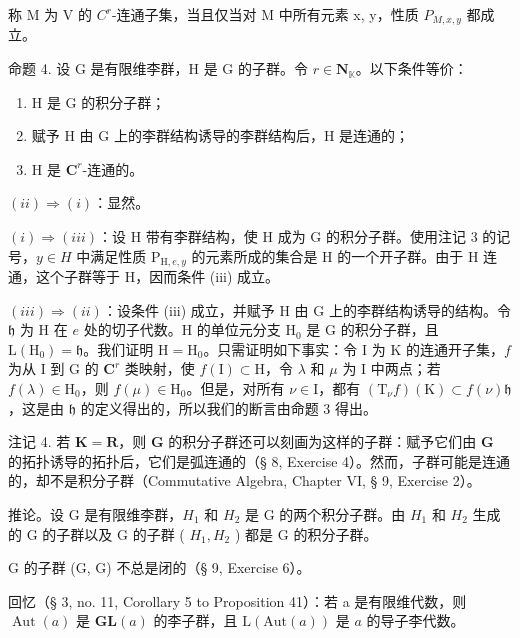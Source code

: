称 M 为 V 的 \(C^{r}\)-连通子集，当且仅当对 M 中所有元素 x, y，性质 \(P_{M,x,y}\) 都成立。

命题 4. 设 G 是有限维李群，H 是 G 的子群。令 \(r \in \mathbf{N}_{\mathbb{K}}\)。以下条件等价：

\begin{enumerate}
\def\labelenumi{(\roman{enumi})}
\item
  H 是 G 的积分子群；
\item
  赋予 H 由 G 上的李群结构诱导的李群结构后，H 是连通的；
\item
  H 是 \(\mathbf{C}^r\)-连通的。
\end{enumerate}

\((ii) \Rightarrow (i)\)：显然。

\((i) \Rightarrow (iii)\)：设 H 带有李群结构，使 H 成为 G 的积分子群。使用注记 3 的记号，\(y \in H\) 中满足性质 \(\mathrm{P}_{\mathrm{H},e,y}\) 的元素所成的集合是 H 的一个开子群。由于 H 连通，这个子群等于 H，因而条件 (iii) 成立。

\((iii) \Rightarrow (ii)\)：设条件 (iii) 成立，并赋予 H 由 G 上的李群结构诱导的结构。令 \(\mathfrak{h}\) 为 H 在 \(e\) 处的切子代数。H 的单位元分支 \(\mathrm{H}_0\) 是 G 的积分子群，且 \(\mathrm{L}(\mathrm{H}_0) = \mathfrak{h}\)。我们证明 \(\mathrm{H} = \mathrm{H}_0\)。只需证明如下事实：令 I 为 K 的连通开子集，\(f\) 为从 I 到 G 的 \(\mathbf{C}^r\) 类映射，使 \(f(\mathrm{I}) \subset \mathrm{H}\)，令 \(\lambda\) 和 \(\mu\) 为 I 中两点；若 \(f(\lambda) \in \mathrm{H}_0\)，则 \(f(\mu) \in \mathrm{H}_0\)。但是，对所有 \(\nu \in \mathrm{I}\)，都有 \((\mathrm{T}_{\nu}f)(\mathrm{K}) \subset f(\nu)\mathfrak{h}\)，这是由 \(\mathfrak{h}\) 的定义得出的，所以我们的断言由命题 3 得出。

注记 4. 若 \(\mathbf{K} = \mathbf{R}\)，则 \(\mathbf{G}\) 的积分子群还可以刻画为这样的子群：赋予它们由 \(\mathbf{G}\) 的拓扑诱导的拓扑后，它们是弧连通的（§ 8, Exercise 4）。然而，子群可能是连通的，却不是积分子群（Commutative Algebra, Chapter VI, § 9, Exercise 2）。

推论。设 G 是有限维李群，\(H_{1}\) 和 \(H_{2}\) 是 G 的两个积分子群。由 \(H_{1}\) 和 \(H_{2}\) 生成的 G 的子群以及 G 的子群 ( \(H_{1}, H_{2}\) ) 都是 G 的积分子群。

G 的子群 (G, G) 不总是闭的（§ 9, Exercise 6）。

回忆（§ 3, no. 11, Corollary 5 to Proposition 41）：若 a 是有限维代数，则 \(\operatorname{Aut}(a)\) 是 \(\mathbf{GL}(a)\) 的李子群，且 \(\mathrm{L}(\mathrm{Aut}(a))\) 是 \(a\) 的导子李代数。

